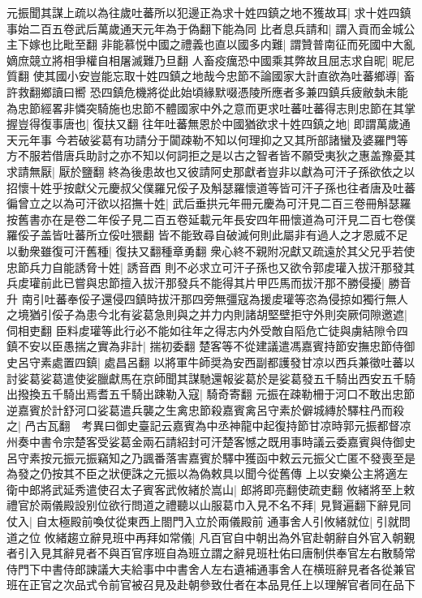 元振聞其謀上疏以為往歲吐蕃所以犯邊正為求十姓四鎮之地不獲故耳|{
	求十姓四鎮事始二百五卷武后萬歲通天元年為于偽翻下能為同}
比者息兵請和|{
	謂入貢而金城公主下嫁也比毗至翻}
非能慕悦中國之禮義也直以國多内難|{
	謂贊普南征而死國中大亂嫡庶競立將相爭權自相屠滅難乃旦翻}
人畜疫癘恐中國乘其弊故且屈志求自昵|{
	昵尼質翻}
使其國小安豈能忘取十姓四鎮之地哉今忠節不論國家大計直欲為吐蕃鄉導|{
	畜許救翻鄉讀曰嚮}
恐四鎮危機將從此始頃緣默啜憑陵所應者多兼四鎮兵疲敝埶未能為忠節經畧非憐突騎施也忠節不體國家中外之意而更求吐蕃吐蕃得志則忠節在其掌握豈得復事唐也|{
	復扶又翻}
往年吐蕃無恩於中國猶欲求十姓四鎮之地|{
	即謂萬歲通天元年事}
今若破娑葛有功請分于闐疎勒不知以何理抑之又其所部諸蠻及婆羅門等方不服若借唐兵助討之亦不知以何詞拒之是以古之智者皆不願受夷狄之惠盖豫憂其求請無厭|{
	厭於鹽翻}
終為後患故也又彼請阿史那獻者豈非以獻為可汗子孫欲依之以招懷十姓乎按獻父元慶叔父僕羅兄俀子及斛瑟羅懷道等皆可汗子孫也往者唐及吐蕃徧曾立之以為可汗欲以招撫十姓|{
	武后垂拱元年冊元慶為可汗見二百三卷冊斛瑟羅按舊書亦在是卷二年俀子見二百五卷延載元年長安四年冊懷道為可汗見二百七卷僕羅俀子盖皆吐蕃所立俀吐猥翻}
皆不能致尋自破滅何則此屬非有過人之才恩威不足以動衆雖復可汗舊種|{
	復扶又翻種章勇翻}
衆心終不親附况獻又疏遠於其父兄乎若使忠節兵力自能誘脅十姓|{
	誘音酉}
則不必求立可汗子孫也又欲令郭䖍瓘入拔汗那發其兵䖍瓘前此已嘗與忠節擅入拔汗那發兵不能得其片甲匹馬而拔汗那不勝侵擾|{
	勝音升}
南引吐蕃奉俀子還侵四鎮時拔汗那四旁無彊寇為援䖍瓘等恣為侵掠如獨行無人之境猶引俀子為患今北有娑葛急則與之并力内則諸胡堅壁拒守外則突厥伺隙邀遮|{
	伺相吏翻}
臣料䖍瓘等此行必不能如往年之得志内外受敵自䧟危亡徒與虜結隙令四鎮不安以臣愚揣之實為非計|{
	揣初委翻}
楚客等不從建議遣馮嘉賓持節安撫忠節侍御史呂守素處置四鎮|{
	處昌呂翻}
以將軍牛師奨為安西副都護發甘凉以西兵兼徵吐蕃以討娑葛娑葛遣使娑臘獻馬在京師聞其謀馳還報娑葛於是娑葛發五千騎出西安五千騎出撥換五千騎出焉耆五千騎出踈勒入寇|{
	騎奇寄翻}
元振在疎勒柵于河口不敢出忠節逆嘉賓於計舒河口娑葛遣兵襲之生禽忠節殺嘉賓禽呂守素於僻城縳於驛柱冎而殺之|{
	冎古瓦翻　考異曰御史臺記云嘉賓為中丞神龍中起復持節甘凉時郭元振都督凉州奏中書令宗楚客受娑葛金兩石請紹封可汗楚客憾之既用事時議云委嘉賓與侍御史呂守素按元振元振竊知之乃諷番落害嘉賓於驛中獲函中敕云元振父亡匿不發喪至是為發之仍按其不臣之狀便誅之元振以為偽敕具以聞今從舊傳}
上以安樂公主將適左衛中郎將武延秀遣使召太子賓客武攸緒於嵩山|{
	郎將即亮翻使疏吏翻}
攸緒將至上敕禮官於兩儀殿設别位欲行問道之禮聽以山服葛巾入見不名不拜|{
	見賢遍翻下辭見同}
仗入|{
	自太極殿前喚仗從東西上閤門入立於兩儀殿前}
通事舍人引攸緒就位|{
	引就問道之位}
攸緒趨立辭見班中再拜如常儀|{
	凡百官自中朝出為外官赴朝辭自外官入朝覲者引入見其辭見者不與百官序班自為班立謂之辭見班杜佑曰唐制供奉官左右散騎常侍門下中書侍郎諫議大夫給事中中書舍人左右遺補通事舍人在横班辭見者各從兼官班在正官之次品式令前官被召見及赴朝參致仕者在本品見任上以理解官者同在品下}
